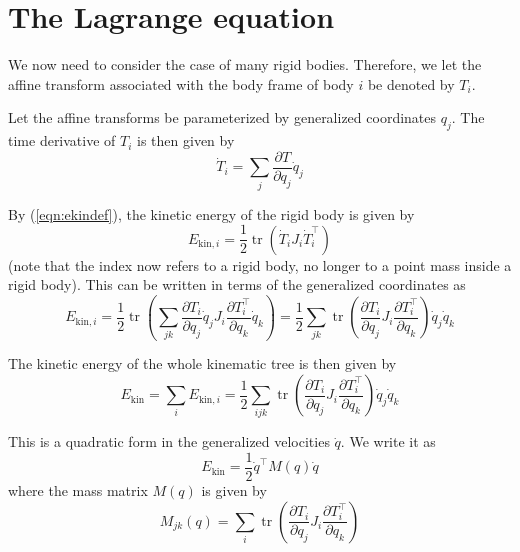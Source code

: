 \documentclass[a4paper]{article}
\begin{document}
\section{The Lagrange equation}
We now need to consider the case of many rigid bodies. Therefore, we let the affine transform associated with the body frame of body $i$ be denoted by $T_i$.

Let the affine transforms be parameterized by generalized coordinates $q_j$. The time derivative of $T_i$ is then given by
\begin{equation}
\dot{T}_i = \sum_{j} \frac{\partial T}{\partial q_j} \dot{q}_j
\end{equation}

By (\ref{eqn:ekindef}), the kinetic energy of the rigid body is given by
\begin{equation}
E_{\mathrm{kin},i} = \frac{1}{2} \operatorname{tr} (\dot{T}_i J_i \dot{T}_i^\top)
\end{equation}
(note that the index now refers to a rigid body, no longer to a point mass inside a rigid body). This can be written in terms of the generalized coordinates as
\begin{equation}
E_{\mathrm{kin},i} = \frac{1}{2} \operatorname{tr} (\sum_{jk} \frac{\partial T_i}{\partial q_j} \dot{q}_j J_i \frac{\partial T_i^\top}{\partial q_k} \dot{q}_k)
= \frac{1}{2} \sum_{jk} \operatorname{tr} (\frac{\partial T_i}{\partial q_j} J_i \frac{\partial T_i^\top}{\partial q_k}) \dot{q}_j \dot{q}_k
\end{equation}

The kinetic energy of the whole kinematic tree is then given by
\begin{equation}
E_\mathrm{kin} = \sum_i E_{\mathrm{kin},i} = \frac{1}{2} \sum_{ijk} \operatorname{tr} (\frac{\partial T_i}{\partial q_j} J_i \frac{\partial T_i^\top}{\partial q_k}) \dot{q}_j \dot{q}_k
\end{equation}

This is a quadratic form in the generalized velocities $\dot{q}$. We write it as
\begin{equation}
E_\mathrm{kin} = \frac{1}{2} \dot{q}^\top M(q) \dot{q}
\end{equation}
where the mass matrix $M(q)$ is given by
\begin{equation}
M_{jk}(q) = \sum_i \operatorname{tr} (\frac{\partial T_i}{\partial q_j} J_i \frac{\partial T_i^\top}{\partial q_k})
\end{equation}
\end{document}
